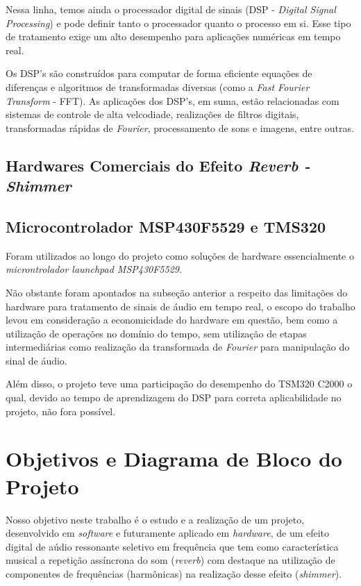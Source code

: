 		Nessa linha, temos ainda o processador digital de sinais (DSP - \textit{Digital Signal Processing}) e pode definir tanto o processador quanto o processo em si. Esse tipo de tratamento exige um alto desempenho para aplicações numéricas em tempo real.
		
		Os DSP's são construídos para computar de forma eficiente equações de diferenças e algoritmos de transformadas diversas (como a \textit{Fast Fourier Transform} - FFT). As aplicações dos DSP's, em suma, estão relacionadas com sistemas de controle de alta velcodiade, realizações de filtros digitais, transformadas rápidas de \textit{Fourier}, processamento de sons e imagens, entre outras.

	\subsection{Hardwares Comerciais do Efeito \textit{Reverb - Shimmer}}
	
	\subsection{Microcontrolador MSP430F5529 e TMS320}
	
	Foram utilizados ao longo do projeto como soluções de hardware essencialmente o \textit{microntrolador launchpad MSP430F5529}.
	
	Não obstante foram apontados na subseção anterior a respeito das limitações do hardware para tratamento de sinais de áudio em tempo real, o escopo do trabalho levou em consideração a economicidade do hardware em questão, bem como a utilização de operações no domínio do tempo, sem utilização de etapas intermediárias como realização da transformada de \textit{Fourier} para manipulação do sinal de áudio. %
	
	Além disso, o projeto teve uma participação do desempenho do TSM320 C2000 o qual, devido ao tempo de aprendizagem do DSP para correta aplicabilidade no projeto, não fora possível. %


\section{Objetivos e Diagrama de Bloco do Projeto}

	Nosso objetivo neste trabalho é o estudo e a realização de um projeto, desenvolvido em \textit{software} e futuramente aplicado em \textit{hardware}, de um efeito digital de aúdio ressonante seletivo em frequência que tem como característica musical a repetição assíncrona do som (\textit{reverb}) com destaque na utilização de componentes de frequências (harmônicas) na realização desse efeito (\textit{shimmer}).
	

